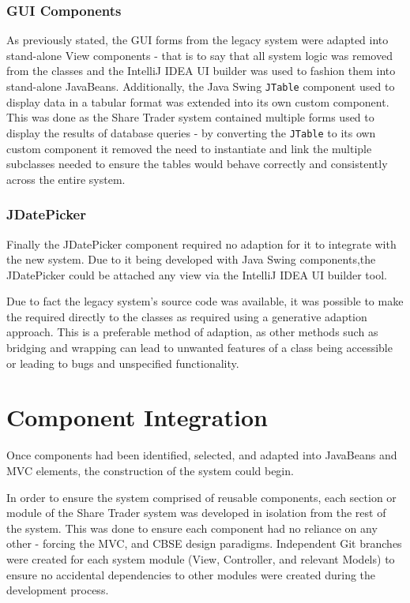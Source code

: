 \documentclass[12pt, a4paper,titlepage]{article}
\begin{document}
\subsubsection{GUI Components}
As previously stated, the GUI forms from the legacy system were adapted into
stand-alone View components - that is to say that all system logic was removed
from the classes and the IntelliJ IDEA UI builder was used to fashion them into
stand-alone JavaBeans.
Additionally, the  Java Swing {\tt JTable} component used to display data in a
tabular format was extended into its own custom component.  
This was done as the Share Trader system contained multiple forms used to
display the results of database queries - by converting the {\tt JTable} to
its own custom component it removed the need to instantiate and link the
multiple subclasses needed to ensure the tables would behave correctly and
consistently across the entire system.

\subsubsection{JDatePicker}
Finally the JDatePicker component required no adaption for it to integrate
with the new system. 
Due to it being developed with Java Swing components,the JDatePicker could be
attached any view via the IntelliJ IDEA UI builder tool.

Due to fact the legacy system’s source code was available, it was possible to
make the required  directly to the classes as required using a generative
adaption approach. 
This is a preferable method of adaption, as other methods such as bridging and
wrapping can lead to unwanted features of a class being accessible or leading
to bugs and unspecified functionality.


\section{Component Integration}
Once components had been identified, selected, and adapted into JavaBeans and
MVC elements, the construction of the system could begin.
 
In order to ensure the system comprised of reusable components, each section
or module of the Share Trader system was developed in isolation from the rest
of the system. 
This was done to ensure  each component had no reliance on any other - forcing
the MVC, and CBSE  design paradigms.  
Independent Git branches were created for each system module (View,
Controller, and relevant Models) to ensure no accidental dependencies to other
modules were created during the development process.
\end{document}
